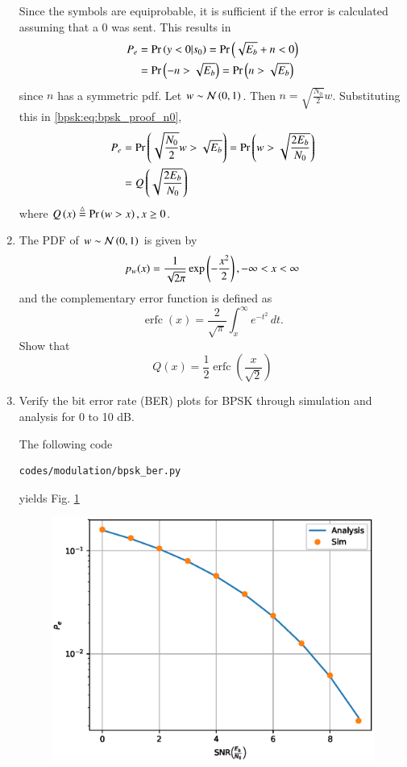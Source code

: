 \begin{enumerate}[label=\arabic*.,ref=\thesubsection.\theenumi]
\solution
Since the symbols are equiprobable, it is sufficient if the error is calculated assuming that a 0 was sent.  This results in
\begin{align}
P_e &= \Pr\left(y < 0|s_0\right) = \Pr\left(\sqrt{E_b} + n < 0\right)
\\
&= \Pr\left( -n > \sqrt{E_b} \right) = \Pr\left( n > \sqrt{E_b} \right)
\label{bpsk:eq:bpsk_proof_n0}
\end{align}
since $n$ has a symmetric pdf.
Let $w \sim \mathcal{N}\left(0,1\right)$.  Then $n = \sqrt{\frac{N_0}{2}}w$. Substituting this in \eqref{bpsk:eq:bpsk_proof_n0},
\begin{align}
P_e &=  \Pr\left( \sqrt{\frac{N_0}{2}}w > \sqrt{E_b} \right) = \Pr\left( w > \sqrt{\frac{2E_b}{N_0}} \right)
\\
&= Q\left(\sqrt{\frac{2E_b}{N_0}}\right)
\end{align}
%
where $Q\left(x\right) \stackrel{\triangle}{=} \Pr\left(w > x\right), x \ge 0$.
\item
The PDF of $w \sim \mathcal{N}\left(0,1\right)$ is given by
%
\begin{equation}
p_{w}(x) = \frac{1}{\sqrt{2\pi}}\exp\left(-\frac{x^2}{2}\right), -\infty < x < \infty
\end{equation}
and the complementary error function is defined as
\begin{equation}
\operatorname {erfc} (x)={\frac {2}{\sqrt {\pi }}}\int _{x}^{\infty }e^{-t^{2}}\,dt.
\end{equation}
%
Show that 
\begin{equation}
Q(x) = \frac{1}{2}\operatorname {erfc}\left({\frac  {x}{{\sqrt  {2}}}}\right)
\end{equation}

\item
Verify the bit error rate (BER) plots for BPSK through simulation and analysis for 0 to 10 dB.

\solution
The following code
\begin{lstlisting}
codes/modulation/bpsk_ber.py
\end{lstlisting}
yields Fig. \ref{bpsk:fig:bpsk_ber}
\begin{figure}[!h]
\centering
\includegraphics[width=\columnwidth]{./modulation/manual/figs/bpsk_ber.eps}
\caption{}
\label{bpsk:fig:bpsk_ber}
\end{figure}


\end{enumerate}
